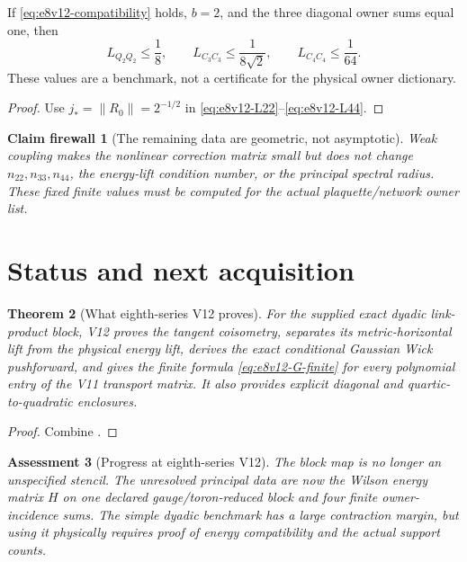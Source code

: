 \documentclass[11pt,oneside]{book}
\newtheorem{theorem}{Theorem}[chapter]
\newtheorem{assessment}[theorem]{Assessment}
\newtheorem{firewall}[theorem]{Claim firewall}
\theoremstyle{definition}
\theoremstyle{remark}
\begin{document}
\begin{example}
\label{ex:e8v12-benchmark}
If \eqref{eq:e8v12-compatibility} holds, \(b=2\), and the three
diagonal owner sums equal one, then
\[
 L_{Q_2Q_2}\le\frac18,\qquad
 L_{C_3C_3}\le\frac1{8\sqrt2},\qquad
 L_{C_4C_4}\le\frac1{64}.                           \label{eq:e8v12-benchmark}
\]
These values are a benchmark, not a certificate for the physical
owner dictionary.
\end{example}

\begin{proof}
Use \(j_*=\|R_0\|=2^{-1/2}\) in
\eqref{eq:e8v12-L22}--\eqref{eq:e8v12-L44}.
\end{proof}

\begin{firewall}[The remaining data are geometric, not asymptotic]
\label{fire:e8v12-incidence}
Weak coupling makes the nonlinear correction matrix small but does
not change \(n_{22},n_{33},n_{44}\), the energy-lift condition number,
or the principal spectral radius.  These fixed finite values must be
computed for the actual plaquette/network owner list.
\end{firewall}

\section{Status and next acquisition}
\label{sec:e8v12-status}

\begin{theorem}[What eighth-series V12 proves]
\label{thm:e8v12-result}
For the supplied exact dyadic link-product block, V12 proves the
tangent coisometry, separates its metric-horizontal lift from the
physical energy lift, derives the exact conditional Gaussian Wick
pushforward, and gives the finite formula
\eqref{eq:e8v12-G-finite} for every polynomial entry of the V11
transport matrix.  It also provides explicit diagonal and
quartic-to-quadratic enclosures.
\end{theorem}

\begin{proof}
Combine
.
\end{proof}

\begin{assessment}[Progress at eighth-series V12]
\label{ass:e8v12-status}
The block map is no longer an unspecified stencil.  The unresolved
principal data are now the Wilson energy matrix \(H\) on one declared
gauge/toron-reduced block and four finite owner-incidence sums.
The simple dyadic benchmark has a large contraction margin, but using
it physically requires proof of energy compatibility and the actual
support counts.
\end{assessment}
\end{document}
